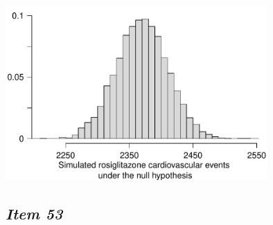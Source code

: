\begin{center}
\includegraphics[width = 0.75\textwidth]{includes/avandia_RandHist} \\
\end{center}

\subsection{\textbf{\textit{Item 53}}}


